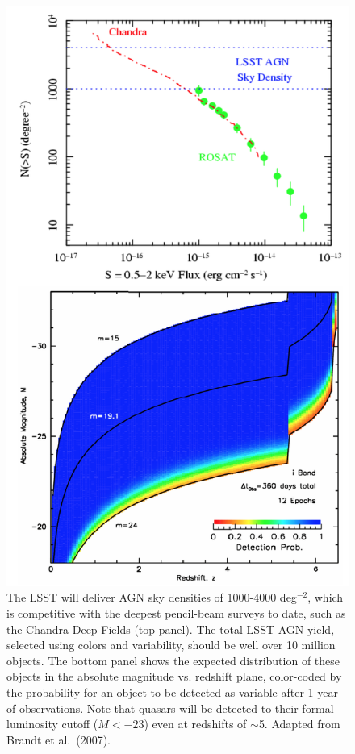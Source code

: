 \begin{figure}
\includegraphics[width=1.0\hsize,clip]{panels3.png}
\caption{The LSST will deliver AGN sky densities of 1000-4000 deg$^{-2}$, which is
competitive with the deepest pencil-beam surveys to date, such as the Chandra
Deep Fields (top panel). The total LSST AGN yield, selected using colors and
variability, should be well over 10 million objects.
The bottom panel shows the expected distribution of these objects in the
absolute magnitude vs. redshift plane, color-coded by the probability for
an object to be
detected as variable after 1 year of observations. Note that quasars will
be detected to their formal luminosity cutoff ($M< -23$) even at redshifts
of $\sim$5. Adapted from Brandt et al.~(2007).}
\label{Fig:panels3}
\end{figure}

